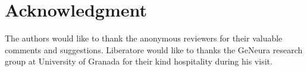 \documentclass[journal]{IEEEtran}
\begin{document}
\section*{Acknowledgment}
The authors would like to thank the anonymous reviewers for their valuable comments and suggestions. Liberatore would like to thanks the GeNeura research group at
University of Granada for their kind hospitality during his visit.




% 







\end{document}
